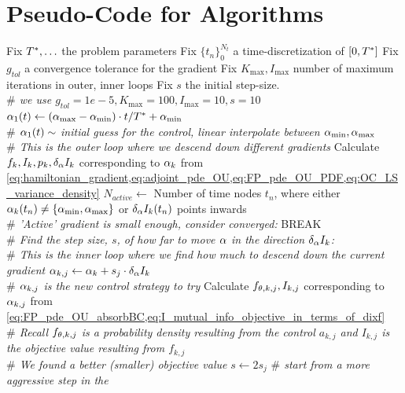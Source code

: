 \documentclass{article}
\begin{document}
\section{Pseudo-Code for Algorithms}
\begin{algorithm}
\begin{algorithmic}
\State Fix ${ T^* }, \ldots$ the problem parameters
\State Fix $\{t_n\}_0^{N_t}$ a time-discretization of $[0,{ T^* }]$
\State Fix $g_{tol}$ a convergence tolerance for the gradient
\State Fix $K_{\max}, I_{\max}$ number of maximum iterations in outer, inner
loops
\State Fix $s$ the initial step-size. 
\\ {\itshape $\#$ we use $g_{tol}=1e-5,K_{\max}=100,I_{\max}=10,s=10$}
\State ${\alpha}_1(t) \gets ({ {\alpha}_{\textrm{max}} }-{ {\alpha}_{\textrm{min}} }) \cdot t / { T^* } + { {\alpha}_{\textrm{min}} }$ 
\\{\itshape  $\#$ ${\alpha}_1(t) \sim$ initial guess for the control, linear
interpolate between ${ {\alpha}_{\textrm{min}} }, { {\alpha}_{\textrm{max}} }$}
\\ {\itshape $\#$ This is the outer loop where we descend down different
gradients}
 \State Calculate $f_k,I_{k},p_k, \delta_{\alpha} I_k$ corresponding to
	${\alpha}_k$ from
	\cref{eq:hamiltonian_gradient,eq:adjoint_pde_OU,eq:FP_pde_OU_PDF,eq:OC_LS_variance_density}
	\State $N_{active}\gets$   Number of time nodes $t_n$, where either
	${\alpha}_k(t_n) \neq \{{ {\alpha}_{\textrm{min}} }, { {\alpha}_{\textrm{max}} }\}$ or $\delta_{\alpha} I_k(t_n)$ points inwards
		  \\ {\itshape  $\#$ 'Active' gradient is small enough,
		 consider converged:}
		 \State BREAK
	\EndIf
	\\ {\itshape $\#$ Find the step size, $s$, of how far to move ${\alpha}$ in the
	direction $\delta_{\alpha} I_k$:}
	\\ {\itshape $\#$ This is the inner loop where we find how much to descend down
	the current gradient}
	\State ${\alpha}_{k,j} \gets {\alpha}_{k} + s_j \cdot \delta_{\alpha} I_k  $
	\\ {\itshape $\#$ ${\alpha}_{k,j}$ is the new control strategy to try}
	\State Calculate $f_{{\theta},k,j}, I_{k,j}$ corresponding to
		${\alpha}_{k,j}$ from
		\cref{eq:FP_pde_OU_absorbBC,eq:I_mutual_info_objective_in_terms_of_dixf} \\
		{\itshape $\#$ Recall $f_{{\theta},k,j}$ is a probability density resulting from
		the control $a_{k,j}$ and $I_{k,j}$ is the objective value resulting from $f_{k,j}$}  
		\\ {\itshape $\#$ We found a better (smaller) objective value}
		\State $s \gets 2 s_j$ {\itshape $\#$ start from a more aggressive step in the
}
\end{algorithmic}
\end{algorithm}
\end{document}
